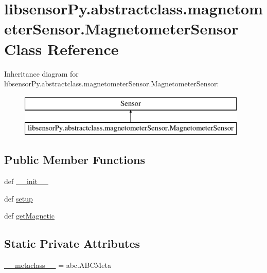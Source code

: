 \hypertarget{classlibsensorPy_1_1abstractclass_1_1magnetometerSensor_1_1MagnetometerSensor}{}\section{libsensor\+Py.\+abstractclass.\+magnetometer\+Sensor.\+Magnetometer\+Sensor Class Reference}
\label{classlibsensorPy_1_1abstractclass_1_1magnetometerSensor_1_1MagnetometerSensor}
Inheritance diagram for libsensor\+Py.\+abstractclass.\+magnetometer\+Sensor.\+Magnetometer\+Sensor\+:\begin{figure}[H]
\begin{center}
\leavevmode
\includegraphics[height=2.000000cm]{classlibsensorPy_1_1abstractclass_1_1magnetometerSensor_1_1MagnetometerSensor}
\end{center}
\end{figure}
\subsection*{Public Member Functions}
\begin{DoxyCompactItemize}
\item 
def \hyperlink{classlibsensorPy_1_1abstractclass_1_1magnetometerSensor_1_1MagnetometerSensor_a8a1b877ab3714e86133194457c4e811f}{\+\_\+\+\_\+init\+\_\+\+\_\+}
\item 
def \hyperlink{classlibsensorPy_1_1abstractclass_1_1magnetometerSensor_1_1MagnetometerSensor_a1170ee29ef4ec51d418171bdbafb6edb}{setup}
\item 
def \hyperlink{classlibsensorPy_1_1abstractclass_1_1magnetometerSensor_1_1MagnetometerSensor_af7049ec75cf22b7f73bc12b7331e6e53}{get\+Magnetic}
\end{DoxyCompactItemize}
\subsection*{Static Private Attributes}
\begin{DoxyCompactItemize}
\item 
\hyperlink{classlibsensorPy_1_1abstractclass_1_1magnetometerSensor_1_1MagnetometerSensor_a93e4df31915a20934e45a1d05836c98b}{\+\_\+\+\_\+metaclass\+\_\+\+\_\+} = abc.\+A\+B\+C\+Meta
\end{DoxyCompactItemize}


